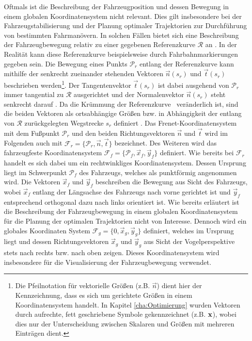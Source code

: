 Oftmals ist die Beschreibung der Fahrzeugposition und dessen Bewegung in einem globalen Koordinatensystem nicht relevant. Dies gilt insbesondere bei der Fahrzeugstabilisierung und der Planung optimaler Trajektorien zur Durchführung von bestimmten Fahrmanövern. In solchen Fällen bietet sich eine Beschreibung der Fahrzeugbewegung relativ zu einer gegebenen Referenzkurve $\mathcal{R}$ an \cite{Rathgeber.2016}. In der Realität kann diese Referenzkurve beispielsweise durch Fahrbahnmarkierungen gegeben sein. Die Bewegung eines Punkts $\mathcal{P}_r$ entlang der Referenzkurve kann mithilfe der senkrecht zueinander stehenden Vektoren $\vec{{n}}(s_r)$ und $\vec{{t}}(s_r)$ beschrieben werden\footnote{Die Pfeilnotation für vektorielle Größen (z.B. $\vec{n}$) dient hier der Kennzeichnung, dass es sich um gerichtete Größen in einem Koordinatensystem handelt. In Kapitel \ref{cha:Optimierung} wurden Vektoren durch aufrechte, fett geschriebene Symbole gekennzeichnet (z.B. $\boldsymbol{\mathrm{x}}$), wobei dies nur der Unterscheidung zwischen Skalaren und Größen mit mehreren Einträgen dient.}. Der Tangentenvektor $\vec{{t}}(s_r)$ ist dabei ausgehend von $\mathcal{P}_r$ immer tangential zu $\mathcal{R}$ ausgerichtet und der Normalenvektor $\vec{{n}}(s_r)$ steht senkrecht darauf \cite{Rathgeber.2016}. Da die Krümmung der Referenzkurve \kapparefofs~veränderlich ist, sind die beiden Vektoren als ortsabhängige Größen bzw. in Abhängigkeit der entlang von $\mathcal{R}$ zurückgelegten Wegstrecke $s_r$ definiert \cite{Werling.2011}. Das Frenet-Koordinatensystem mit dem Fußpunkt $\mathcal{P}_r$ und den beiden Richtungsvektoren $\vec{{n}}$ und $\vec{{t}}$ wird im Folgenden auch mit $\mathcal{F}_r = \{\mathcal{P}_r, \vec{{n}}, \vec{{t}}\}$ bezeichnet. Des Weiteren wird das fahrzeugfeste Koordinatensystem $\mathcal{F}_f = \{\mathcal{P}_f, \vec{x}_f, \vec{y}_f\}$ definiert. Wie bereits bei $\mathcal{F}_r$ handelt es sich dabei um ein rechtwinkliges Koordinatensystem. Dessen Ursprung liegt im Schwerpunkt $\mathcal{P}_f$ des Fahrzeugs, welches als punktförmig angenommen wird. Die Vektoren $\vec{x}_f$ und $\vec{y}_f$ beschreiben die Bewegung aus Sicht des Fahrzeugs, wobei $\vec{x}_f$ entlang der Längsachse des Fahrzeugs nach vorne gerichtet ist und $\vec{y}_f$ entsprechend orthogonal dazu nach links orientiert ist. Wie bereits erläutert ist die Beschreibung der Fahrzeugbewegung in einem globalen Koordinatensystem für die Planung der optimalen Trajektorien nicht von Interesse. Dennoch wird ein globales Koordinaten System $\mathcal{F}_g = \{0, \vec{x}_g, \vec{y}_g\}$ definiert, welches im Ursprung liegt und dessen Richtungsvektoren $\vec{x}_g$ und $\vec{y}_g$ aus Sicht der Vogelperspektive stets nach rechts bzw. nach oben zeigen. Dieses Koordinatensystem wird insbesondere für die Visualisierung der Fahrzeugbewegung verwendet.

